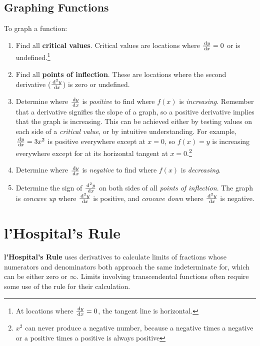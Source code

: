 \subsection{Graphing Functions}
To graph a function:
  \begin{enumerate}
   \item Find all \textbf{critical values}. Critical values are locations where $\frac{\,\mathrm{d} y}{\,\mathrm{d} x}=0$ or is undefined.\footnote{At locations where $\frac{\,\mathrm{d} y}{\,\mathrm{d} x}=0$, the tangent line is horizontal.}
   \item Find all \textbf{points of inflection}. These are locations where the second derivative ($\frac{\,\mathrm{d}^2y}{\,\mathrm{d} x}$) is zero or undefined.
   \item Determine where $\frac{\,\mathrm{d} y}{\,\mathrm{d} x}$ is \emph{positive} to find where $f(x)$ is \emph{increasing}. Remember that a derivative signifies the slope of a graph, so a positive derivative implies that the graph is increasing. This can be achieved either by testing values on each side of a \emph{critical value}, or by intuitive understanding. For example, $\frac{\,\mathrm{d} y}{\,\mathrm{d} x}=3x^2$ is positive everywhere except at $x=0$, so $f(x)=y$ is increasing everywhere except for at its horizontal tangent at $x=0$.\footnote{$x^2$ can never produce a negative number, because a negative times a negative or a positive times a positive is always positive}
   \item Determine where $\frac{\,\mathrm{d} y}{\,\mathrm{d} x}$ is \emph{negative} to find where $f(x)$ is \emph{decreasing}.
   \item Determine the sign of $\frac{\,\mathrm{d}^2y}{\,\mathrm{d} x}$ on both sides of all \emph{points of inflection}. The graph is \emph{concave up} where $\frac{\,\mathrm{d}^2y}{\,\mathrm{d} x}$ is positive, and \emph{concave down} where $\frac{\,\mathrm{d}^2y}{\,\mathrm{d} x}$ is negative.
  \end{enumerate}
\section{l'Hospital's Rule}\label{lhospital}

\textbf{l'Hospital's Rule} uses derivatives to calculate limits of fractions whose numerators and denominators both approach the same indeterminate for, which can be either zero or $\infty$. Limits involving transcendental functions often require some use of the rule for their calculation.

